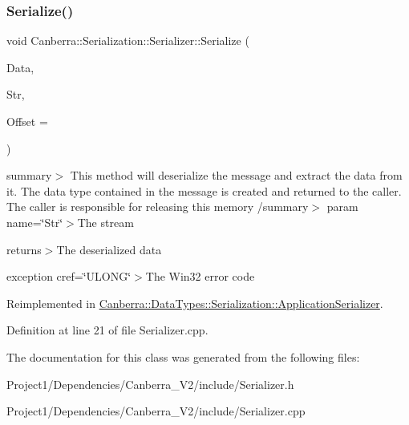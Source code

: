 \subsubsection{\texorpdfstring{Serialize()}{Serialize()}}
{\footnotesize\ttfamily void Canberra\+::\+Serialization\+::\+Serializer\+::\+Serialize (\begin{DoxyParamCaption}\item[{\hyperlink{class_canberra_1_1_serialization_1_1_serializable_object}{Serializable\+Object} $\ast$}]{Data,  }\item[{\hyperlink{class_canberra_1_1_utility_1_1_core_1_1_byte_stream}{Canberra\+::\+Utility\+::\+Core\+::\+Byte\+Stream} \&}]{Str,  }\item[{const L\+O\+NG}]{Offset = {} }\end{DoxyParamCaption})\hspace{0.3cm}{\ttfamily [virtual]}}

summary$>$ This method will deserialize the message and extract the data from it. The data type contained in the message is created and returned to the caller. The caller is responsible for releasing this memory /summary$>$ param name=\char`\"{}\+Str\char`\"{}$>$The stream

returns$>$The deserialized data

exception cref=\char`\"{}\+U\+L\+O\+N\+G\char`\"{}$>$The Win32 error code

Reimplemented in \hyperlink{class_canberra_1_1_data_types_1_1_serialization_1_1_application_serializer_aa0e18d74f0a1fad87295808182febf52_aa0e18d74f0a1fad87295808182febf52}{Canberra\+::\+Data\+Types\+::\+Serialization\+::\+Application\+Serializer}.



Definition at line 21 of file Serializer.\+cpp.



The documentation for this class was generated from the following files\+:\begin{DoxyCompactItemize}
\item 
Project1/\+Dependencies/\+Canberra\+\_\+\+V2/include/Serializer.\+h\item 
Project1/\+Dependencies/\+Canberra\+\_\+\+V2/include/Serializer.\+cpp\end{DoxyCompactItemize}
